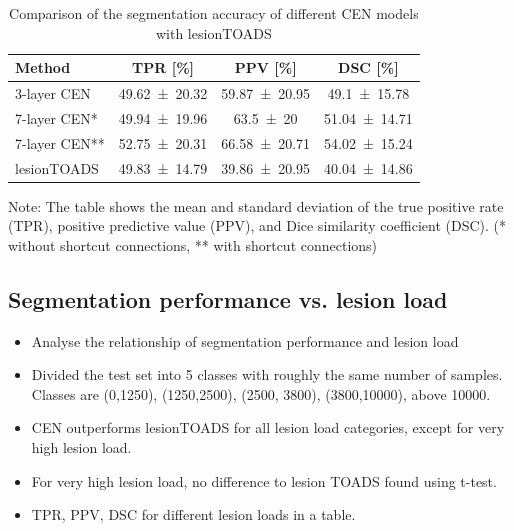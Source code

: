 \begin{table}
\begin{center}
\caption{Comparison of the segmentation accuracy of different CEN models with
lesionTOADS}
\label{tab:results1}
\begin{tabular}{@{}lccc@{}}
\toprule
Method & TPR [\%] & PPV [\%] & DSC [\%] \\
\midrule
3-layer CEN & \num{49.62+-20.32} & \num{59.87+-20.95} & \num{49.1+-15.78} \\
7-layer CEN* & \num{49.94+-19.96} & \num{63.5+-20} & \num{51.04+-14.71} \\
7-layer CEN** & \num{52.75+-20.31} & \num{66.58+-20.71} &
\num{54.02+-15.24}
\\[0.2em]
lesionTOADS & \num{49.83+-14.79} & \num{39.86+-20.95} & \num{40.04+-14.86} \\
\bottomrule
\end{tabular}
\end{center}
Note: The table shows the mean and standard deviation of the true positive rate
(TPR), positive predictive value (PPV), and Dice similarity coefficient (DSC).
(* without shortcut connections, ** with shortcut connections)
\end{table}

\subsection{Segmentation performance vs. lesion load}

\begin{itemize}
\item Analyse the relationship of segmentation performance and lesion load
\item Divided the test set into 5 classes with roughly the same number of
samples. Classes are (0,1250), (1250,2500), (2500, 3800), (3800,10000), above
10000.
\item CEN outperforms lesionTOADS for all lesion load categories, except for
very high lesion load.
\item For very high lesion load, no difference to lesion TOADS found using
t-test.
\item TPR, PPV, DSC for different lesion loads in a table.
\end{itemize}

